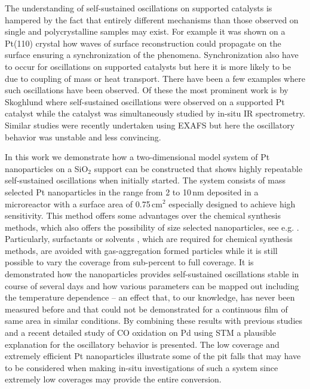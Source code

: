 \documentclass[journal=jacsat,manuscript=article]{achemso}
\begin{document}
The understanding of self-sustained oscillations on supported
catalysts is hampered by the fact that entirely different mechanisms than those
observed on single and polycrystalline samples may exist. For example it was
shown on a Pt(110) crystal how waves of surface reconstruction could propagate
on the surface ensuring a synchronization of the phenomena. Synchronization also have to
occur for oscillations on supported catalysts but here it is more likely to be
due to coupling of mass or heat transport. There have been a few examples where
such oscillations have been observed. Of these the most prominent work is by
Skoghlund\cite{Carlsson2006} where self-sustained oscillations were observed on
a supported Pt catalyst while the catalyst was simultaneously studied by in-situ
IR spectrometry. Similar studies were recently undertaken using EXAFS
\cite{Singh2010} but here the oscillatory behavior was unstable and less
convincing.

In this work we demonstrate how a two-dimensional model system of Pt
nanoparticles on a SiO$_2$ support can be constructed that shows highly
repeatable self-sustained oscillations when initially started. The system
consists of mass selected Pt nanoparticles in the range from 2 to 10\,nm 
deposited in a microreactor with a surface area of 0.75\,cm$^2$
especially designed to achieve high sensitivity\cite{Henriksen2009}. This
method offers some advantages over the chemical synthesis methods, which also
offers the possibility of size selected nanoparticles, see e.g.
\cite{Tsang2008,Shao2011}. Particularly, surfactants or solvents
\cite{Biacchi2011}, which are required for
chemical synthesis methods, are avoided with gas-aggregation formed particles
while it is still possible to vary the coverage from sub-percent to full coverage.
It is demonstrated how the nanoparticles provides self-sustained
oscillations stable in course of several days and how various parameters can be mapped out
including the temperature dependence -- an effect that, to our knowledge, has
never been measured before and that could
not be demonstrated for a continuous film of same area in similar conditions.
By combining these results with previous studies \cite{Carlsson2006,Singh2010}
and a recent detailed study of CO oxidation on Pd using STM
\cite{Hendriksen2010} a plausible explanation for the oscillatory behavior is
presented. The low coverage and extremely efficient Pt nanoparticles illustrate
some of the pit falls that may have to be considered when making in-situ
investigations of such a system since extremely low coverages may provide the
entire conversion.
\end{document}
